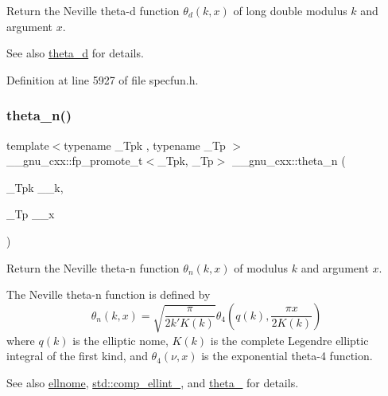 Return the Neville theta-\/d function $ \theta_d(k,x) $ of {\ttfamily long double} modulus $ k $ and argument $ x $.

\begin{DoxySeeAlso}{See also}
\hyperlink{group__gnu__math__spec__func_ga258edb995137d9e6344b3cd750266d74}{theta\+\_\+d} for details. 
\end{DoxySeeAlso}


Definition at line 5927 of file specfun.\+h.

\mbox{\label{group__gnu__math__spec__func_ga202778bd650e04e9f3729bfca35c32e2}} 
\subsubsection{\texorpdfstring{theta\+\_\+n()}{theta\_n()}}
{\footnotesize\ttfamily template$<$typename \+\_\+\+Tpk , typename \+\_\+\+Tp $>$ \\
\+\_\+\+\_\+gnu\+\_\+cxx\+::fp\+\_\+promote\+\_\+t$<$\+\_\+\+Tpk, \+\_\+\+Tp$>$ \+\_\+\+\_\+gnu\+\_\+cxx\+::theta\+\_\+n (\begin{DoxyParamCaption}\item[{\+\_\+\+Tpk}]{\+\_\+\+\_\+k,  }\item[{\+\_\+\+Tp}]{\+\_\+\+\_\+x }\end{DoxyParamCaption})\hspace{0.3cm}{\ttfamily [inline]}}

Return the Neville theta-\/n function $ \theta_n(k,x) $ of modulus $ k $ and argument $ x $.

The Neville theta-\/n function is defined by \[ \theta_n(k,x) = \sqrt{\frac{\pi}{2k'K(k)}} \theta_4\left(q(k),\frac{\pi x}{2K(k)}\right) \] where $ q(k) $ is the elliptic nome, $ K(k) $ is the complete Legendre elliptic integral of the first kind, and $ \theta_4(\nu,x) $ is the exponential theta-\/4 function. \begin{DoxySeeAlso}{See also}
\hyperlink{group__gnu__math__spec__func_ga7bfb34f8b5c0ed7c72040f9cb7034bba}{ellnome}, \hyperlink{group__cxx17__math__spec__func_gad559217fb01e7a8b7a6e23eeedda64be}{std\+::comp\+\_\+ellint\+\_}, and \hyperlink{group__gnu__math__spec__func_ga8a6f8b69272a9f205a13e1745832ada3}{theta\+\_} for details.
\end{DoxySeeAlso}

